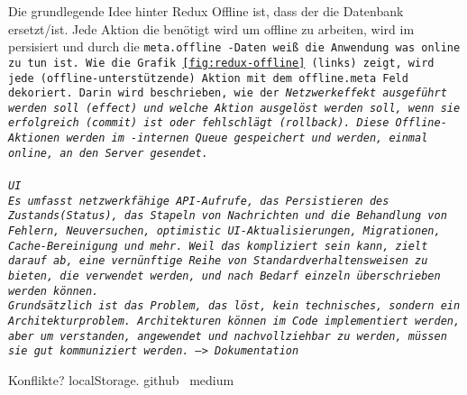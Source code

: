 Die grundlegende Idee hinter Redux Offline ist, dass der  die Datenbank ersetzt/ist. Jede Aktion die benötigt wird um offline zu arbeiten, wird im  persisiert und durch die \tt{meta.offline} -Daten weiß die Anwendung was online zu tun ist. Wie die Grafik \ref{fig:redux-offline} (links) zeigt, wird jede (offline-unterstützende) Aktion mit dem \tt{offline.meta} Feld dekoriert. Darin wird beschrieben, wie der \it{Netzwerkeffekt} ausgeführt werden soll (\tt{effect}) und welche Aktion ausgelöst werden soll, wenn sie erfolgreich (\tt{commit}) ist oder fehlschlägt (\tt{rollback}). Diese Offline-Aktionen werden im -internen \gls{Queue} gespeichert und werden, einmal online, an den Server gesendet.\\\\
\gls{UI}\\
Es umfasst netzwerkfähige \gls{API}-Aufrufe, das Persistieren des Zustands(Status), das Stapeln von Nachrichten und die Behandlung von Fehlern, Neuversuchen, \gls{optimistic UI}-Aktualisierungen, Migrationen, Cache-Bereinigung und mehr.
Weil das kompliziert sein kann, zielt  darauf ab, eine vernünftige Reihe von Standardverhaltensweisen zu bieten, die verwendet werden, und nach Bedarf einzeln überschrieben werden können.\\
Grundsätzlich ist das Problem, das  löst, kein technisches, sondern ein Architekturproblem. Architekturen können im Code implementiert werden, aber um verstanden, angewendet und nachvollziehbar zu werden, müssen sie gut kommuniziert werden. --> Dokumentation

{\large Konflikte?}
%
%
localStorage. github~\cite{redux-persist-gh} medium~\cite{redux-persist}
